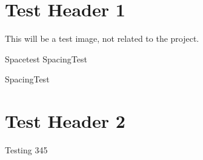 \hypertarget{index_sec3}{}\section{Test Header 1}\label{index_sec3}
This will be a test image, not related to the project.

 Spacetest  Spacing\+Test

Spacing\+Test \hypertarget{index_sec4}{}\section{Test Header 2}\label{index_sec4}
Testing 345 